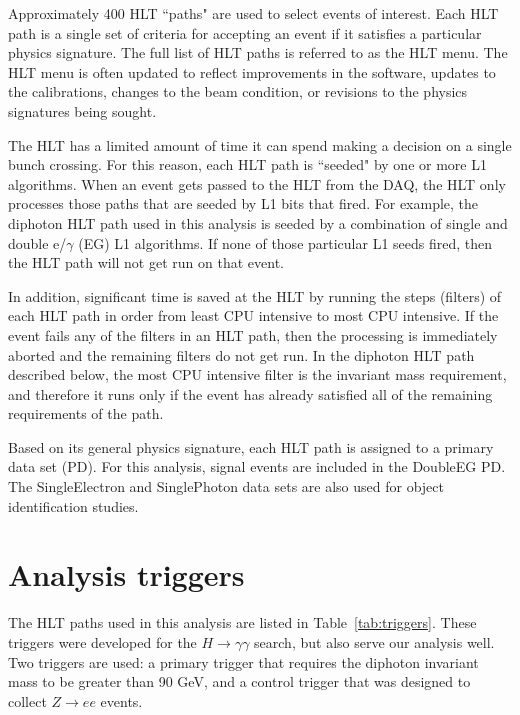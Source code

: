 Approximately 400 HLT ``paths" are used to select events of interest. Each HLT path is a single set of criteria for accepting an event if it satisfies a particular physics signature. The full list of HLT paths is referred to as the HLT menu. The HLT menu is often updated to reflect improvements in the software, updates to the calibrations, changes to the beam condition, or revisions to the physics signatures being sought. 

The HLT has a limited amount of time it can spend making a decision on a single bunch crossing. For this reason, each HLT path is ``seeded" by one or more L1 algorithms. When an event gets passed to the HLT from the DAQ, the HLT only processes those paths that are seeded by L1 bits that fired. 
For example, the diphoton HLT path used in this analysis is seeded by a combination of single and double e/$\gamma$ (EG) L1 algorithms. If none of those particular L1 seeds fired, then the HLT path will not get run on that event. 

In addition, significant time is saved at the HLT by running the steps (filters) of each HLT path in order from least CPU intensive to most CPU intensive. If the event fails any of the filters in an HLT path, then the processing is immediately aborted and the remaining filters do not get run. In the diphoton HLT path described below, the most CPU intensive filter is the invariant mass requirement, and therefore it runs only if the event has already satisfied all of the remaining requirements of the path.

Based on its general physics signature, each HLT path is assigned to a primary data set (PD). For this analysis, signal events are included in the DoubleEG PD. The SingleElectron and SinglePhoton data sets are also used for object identification studies.

\section{Analysis triggers}
\label{sec:analysisTrig}

The HLT paths used in this analysis are listed in Table~\ref{tab:triggers}. These triggers were developed for the $H \rightarrow \gamma\gamma$ search, 
but also serve our analysis well. Two triggers are used: a primary trigger that requires the diphoton invariant mass to be greater than 90 GeV, and a control
trigger that was designed to collect $Z\rightarrow ee$ events. 

